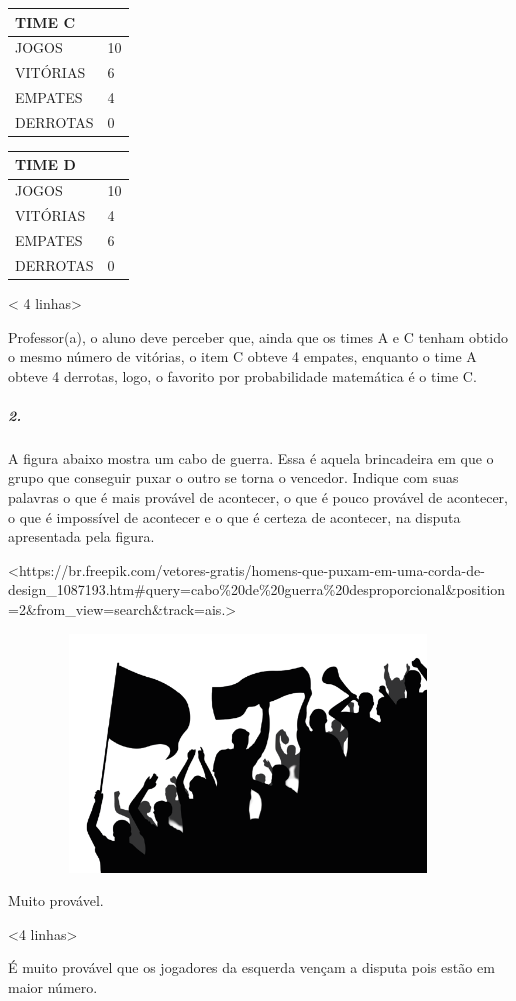 \begin{longtable}[]{@{}ll@{}}
\toprule
TIME C\tabularnewline
\midrule
\endhead
JOGOS & 10\tabularnewline
VITÓRIAS & 6\tabularnewline
EMPATES & 4\tabularnewline
DERROTAS & 0\tabularnewline
\bottomrule
\end{longtable}

\begin{longtable}[]{@{}ll@{}}
\toprule
TIME D\tabularnewline
\midrule
\endhead
JOGOS & 10\tabularnewline
VITÓRIAS & 4\tabularnewline
EMPATES & 6\tabularnewline
DERROTAS & 0\tabularnewline
\bottomrule
\end{longtable}

\textless{} 4 linhas\textgreater{}

Professor(a), o aluno deve perceber que, ainda que os times A e C tenham
obtido o mesmo número de vitórias, o item C obteve 4 empates, enquanto o
time A obteve 4 derrotas, logo, o favorito por probabilidade matemática
é o time C.

\subparagraph{2.}\label{section-69}

A figura abaixo mostra um cabo de guerra. Essa é aquela brincadeira em
que o grupo que conseguir puxar o outro se torna o vencedor. Indique com
suas palavras o que é mais provável de acontecer, o que é pouco provável
de acontecer, o que é impossível de acontecer e o que é certeza de
acontecer, na disputa apresentada pela figura.

\textless{}https://br.freepik.com/vetores-gratis/homens-que-puxam-em-uma-corda-de-design\_1087193.htm\#query=cabo\%20de\%20guerra\%20desproporcional\&position=2\&from\_view=search\&track=ais.\textgreater{}

\includegraphics[width=5.00000in,height=2.48958in]{media/image84.png}

Muito provável.

\textless{}4 linhas\textgreater{}

É muito provável que os jogadores da esquerda vençam a disputa pois
estão em maior número.

